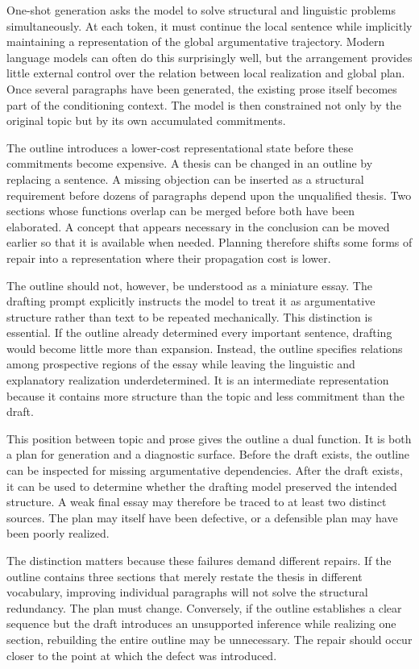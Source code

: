 \documentclass[11pt]{article}
\begin{document}
One-shot generation asks the model to solve structural and linguistic problems simultaneously. At each token, it must continue the local sentence while implicitly maintaining a representation of the global argumentative trajectory. Modern language models can often do this surprisingly well, but the arrangement provides little external control over the relation between local realization and global plan. Once several paragraphs have been generated, the existing prose itself becomes part of the conditioning context. The model is then constrained not only by the original topic but by its own accumulated commitments.

The outline introduces a lower-cost representational state before these commitments become expensive. A thesis can be changed in an outline by replacing a sentence. A missing objection can be inserted as a structural requirement before dozens of paragraphs depend upon the unqualified thesis. Two sections whose functions overlap can be merged before both have been elaborated. A concept that appears necessary in the conclusion can be moved earlier so that it is available when needed. Planning therefore shifts some forms of repair into a representation where their propagation cost is lower.

The outline should not, however, be understood as a miniature essay. The drafting prompt explicitly instructs the model to treat it as argumentative structure rather than text to be repeated mechanically. This distinction is essential. If the outline already determined every important sentence, drafting would become little more than expansion. Instead, the outline specifies relations among prospective regions of the essay while leaving the linguistic and explanatory realization underdetermined. It is an intermediate representation because it contains more structure than the topic and less commitment than the draft.

This position between topic and prose gives the outline a dual function. It is both a plan for generation and a diagnostic surface. Before the draft exists, the outline can be inspected for missing argumentative dependencies. After the draft exists, it can be used to determine whether the drafting model preserved the intended structure. A weak final essay may therefore be traced to at least two distinct sources. The plan may itself have been defective, or a defensible plan may have been poorly realized.

The distinction matters because these failures demand different repairs. If the outline contains three sections that merely restate the thesis in different vocabulary, improving individual paragraphs will not solve the structural redundancy. The plan must change. Conversely, if the outline establishes a clear sequence but the draft introduces an unsupported inference while realizing one section, rebuilding the entire outline may be unnecessary. The repair should occur closer to the point at which the defect was introduced.
\end{document}
